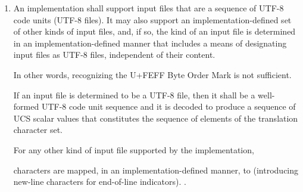 \documentclass{wg21}
\begin{document}
\begin{enumerate}


\item

\begin{addedblock}
%
%
%

An implementation shall support input files that are a sequence of UTF-8 code units (UTF-8 files). It may also support an implementation-defined set of other kinds of input files, and, if so, the kind of an input file is determined in an implementation-defined manner that includes a means of designating input files as UTF-8 files, independent of their content. \begin{note}In other words, recognizing the U+FEFF Byte Order Mark is not sufficient.\end{note}

If an input file is determined to be a UTF-8 file, then it shall be a well-formed UTF-8 code unit sequence and it is decoded to produce a sequence of UCS scalar values that constitutes the sequence of elements of the translation character set.

For any other kind of input file supported by the implementation, \end{addedblock}
 characters are mapped, in an
implementation-defined manner, to  (introducing new-line characters for end-of-line
indicators).
.


\end{enumerate}
\end{document}
